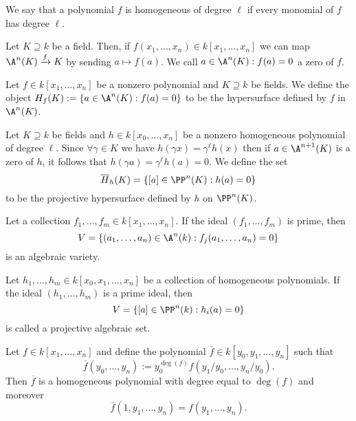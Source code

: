 \begin{definition}
   We say that a polynomial \(f\) is homogeneous of degree \(\ell\) if every
   monomial of \(f\) has degree \(\ell\). 
\end{definition}

Let \(K \supseteq k\) be a field. Then, if \(f(x_1, \dots, x_n) \in k[x_1, \dots,
x_n]\) we can map \(\A^n(K) \xrightarrow{f} K\) by sending \(a \mapsto f(a)\).
We call \(a \in \A^n(K) : f(a) = 0\) a zero of \(f\).

\begin{definition}[Hypersurface]
   Let \(f \in k[x_1, \dots, x_n]\) be a nonzero polynomial and \(K \supseteq
   k\) be fields. We define the object \(H_f(K) := \{a \in \A^n(K) : f(a) = 0\}
   \) to be the hypersurface defined by \(f\) in \(\A^n(K)\).
\end{definition}

\begin{definition}
   Let \(K \supseteq k\) be fields and \(h \in k[x_0, \dots, x_n]\) be a nonzero
   homogeneous polynomial of degree \(\ell\). Since \(\forall \gamma \in K\) we
   have \(h(\gamma x) = \gamma^\ell h(x)\) then if \(a \in \A^{n+1}(K)\) is a
   zero of \(h\), it follows that \(h(\gamma a) = \gamma^\ell h(a) = 0\). We
   define the set
    \[
       \overline{H}_h(K) = \{[a] \in \PP^n(K) : h(a) = 0\} 
   \] 
   to be the projective hypersurface defined by \(h\) on \(\PP^n(K)\).
\end{definition}

\begin{definition}
   Let a collection \(f_1, \dots, f_m \in k[x_1, \dots, x_n]\). If the ideal
   \((f_1, \dots, f_m)\) is prime, then
    \[
       V = \{(a_1, \dots, a_n) \in \A^n(k) :f_j(a_1, \dots, a_n) = 0\} 
   \] 
   is an algebraic variety.
\end{definition}

\begin{definition}
   Let \(h_1, \dots, h_m \in k[x_0, x_1, \dots, x_n]\) be a collection of
   homogeneous polynomials. If the ideal \((h_1,\dots,h_m)\) is a prime ideal,
   then
    \[
       V = \{[a] \in \PP^{n}(k) : h_i(a) = 0\} 
   \] 
   is called a projective algebraic set.
\end{definition}

\begin{proposition}[Homogeneization]
   Let \(f \in k[x_1, \dots, x_n]\) and define the polynomial \(\overline{f} \in
   k[y_0, y_1,\dots,y_n]\) such that
   \[
      \overline{f}(y_0, \dots, y_n) := y_0^{\deg(f)} f\left( y_1/y_0, \dots,
      y_n/y_0 \right).
   \] 
   Then \(\overline{f}\) is a homogeneous polynomial with degree equal to
   \(\deg(f)\) and moreover \[\overline{f}(1, y_1, \dots, y_n) = f(y_1, \dots,
   y_n).\]
\end{proposition}

